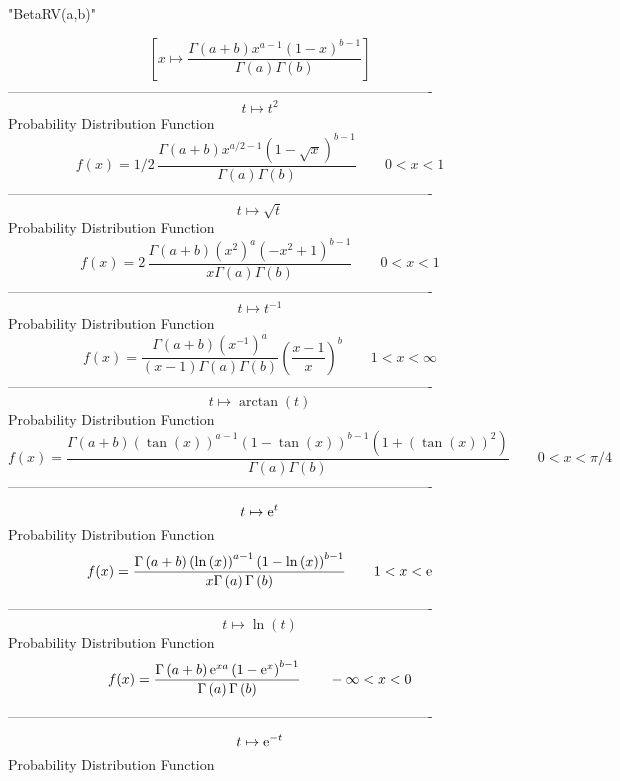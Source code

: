\documentclass[12pt]{article}
\begin{document}
 
                                "BetaRV(a,b)"

$$[x\mapsto {\frac {\Gamma \left( a+b \right) {x}^{a-1} \left( 1-x
 \right) ^{b-1}}{\Gamma \left( a \right) \Gamma \left( b \right) }}]
$$-------------------------------------------------------------------------------------------  \\$$t\mapsto {t}^{2}
$$Probability Distribution Function 
$$  f(x)=1/2\,{\frac {\Gamma \left( a+b \right) {x}^{a/2-1} \left( 1-\sqrt {x}
 \right) ^{b-1}}{\Gamma \left( a \right) \Gamma \left( b \right) }}
 \qquad0
 < x < 1
$$-------------------------------------------------------------------------------------------  \\$$t\mapsto \sqrt {t}
$$Probability Distribution Function 
$$  f(x)=2\,{\frac {\Gamma \left( a+b \right)  \left( {x}^{2} \right) ^{a}
 \left( -{x}^{2}+1 \right) ^{b-1}}{x\Gamma \left( a \right) \Gamma
 \left( b \right) }}
 \qquad0
 < x < 1
$$-------------------------------------------------------------------------------------------  \\$$t\mapsto {t}^{-1}
$$Probability Distribution Function 
$$  f(x)={\frac {\Gamma \left( a+b \right)  \left( {x}^{-1} \right) ^{a}}{
 \left( x-1 \right) \Gamma \left( a \right) \Gamma \left( b \right) }
 \left( {\frac {x-1}{x}} \right) ^{b}}
 \qquad1
 < x < \infty 
$$-------------------------------------------------------------------------------------------  \\$$t\mapsto \arctan \left( t \right) 
$$Probability Distribution Function 
$$  f(x)={\frac {\Gamma \left( a+b \right)  \left( \tan \left( x \right) 
 \right) ^{a-1} \left( 1-\tan \left( x \right)  \right) ^{b-1} \left( 
1+ \left( \tan \left( x \right)  \right) ^{2} \right) }{\Gamma \left( 
a \right) \Gamma \left( b \right) }}
 \qquad0
 < x < \pi/4
$$-------------------------------------------------------------------------------------------  \\$$t\mapsto {{\rm e}^{t}}
$$Probability Distribution Function 
$$  f(x)={\frac {\Gamma \left( a+b \right)  \left( \ln  \left( x \right) 
 \right) ^{a-1} \left( 1-\ln  \left( x \right)  \right) ^{b-1}}{x
\Gamma \left( a \right) \Gamma \left( b \right) }}
 \qquad1
 < x < {\rm e}
$$-------------------------------------------------------------------------------------------  \\$$t\mapsto \ln  \left( t \right) 
$$Probability Distribution Function 
$$  f(x)={\frac {\Gamma \left( a+b \right) {{\rm e}^{xa}} \left( 1-{{\rm e}^{x}
} \right) ^{b-1}}{\Gamma \left( a \right) \Gamma \left( b \right) }}
 \qquad-\infty 
 < x < 0
$$-------------------------------------------------------------------------------------------  \\$$t\mapsto {{\rm e}^{-t}}
$$Probability Distribution Function 
\end{document}
